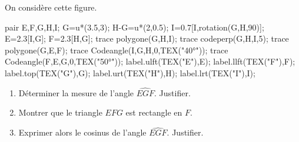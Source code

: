 \begin{exercice*}
    On considère cette figure.

    \begin{center}
        \begin{Geometrie}
            pair E,F,G,H,I;            
            G=u*(3.5,3);
            H-G=u*(2,0.5);
            I=0.7[I,rotation(G,H,90)];            
            E=2.3[I,G];
            F=2.3[H,G];
            trace polygone(G,H,I);
            trace codeperp(G,H,I,5);
            trace polygone(G,E,F);
            trace Codeangle(I,G,H,0,TEX("\ang{40}"));
            trace Codeangle(F,E,G,0,TEX("\ang{50}"));
            label.ulft(TEX("E"),E);
            label.llft(TEX("F"),F);
            label.top(TEX("G"),G);
            label.urt(TEX("H"),H);
            label.lrt(TEX("I"),I);
        \end{Geometrie}
    \end{center}
    \begin{enumerate}
        \item Déterminer la mesure de l'angle $\widehat{EGF}$. Justifier.
        \item Montrer que le triangle $EFG$ est rectangle en $F$.
        \item Exprimer alors le cosinus de l'angle $\widehat{EGF}$. Justifier.
    \end{enumerate}
\end{exercice*}

